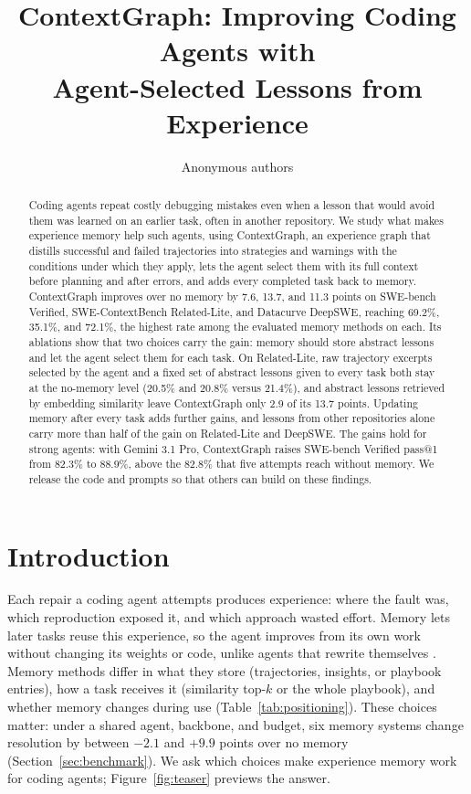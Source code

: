 \documentclass{article}
\title{ContextGraph: Improving Coding Agents with\\Agent-Selected Lessons from Experience}
\author{Anonymous authors}
\begin{document}
\maketitle

\begin{abstract}
Coding agents repeat costly debugging mistakes even when a lesson that would
avoid them was learned on an earlier task, often in another repository. We
study what makes experience memory help such agents, using ContextGraph, an
experience graph that distills successful and failed trajectories into
strategies and warnings with the conditions under which they apply, lets the
agent select them with its full context before planning and after errors,
and adds every completed task back to memory. ContextGraph improves over no
memory by 7.6, 13.7, and 11.3 points on SWE-bench Verified, SWE-ContextBench
Related-Lite, and Datacurve DeepSWE, reaching 69.2\%, 35.1\%, and 72.1\%, the
highest rate among the evaluated memory methods on each. Its ablations show
that two choices carry the gain: memory should store abstract lessons and let
the agent select them for each task. On Related-Lite, raw
trajectory excerpts selected by the agent and a fixed set of abstract lessons
given to every task both stay at the no-memory level (20.5\% and 20.8\%
versus 21.4\%), and abstract lessons retrieved by embedding similarity leave
ContextGraph only 2.9 of its 13.7 points. Updating memory after every task
adds further gains, and lessons from other repositories alone carry more than
half of the gain on Related-Lite and DeepSWE. The gains hold for
strong agents: with Gemini 3.1 Pro, ContextGraph raises SWE-bench Verified
pass@1 from 82.3\% to 88.9\%, above the 82.8\% that five attempts reach
without memory.
We release the code and prompts so that others can build on these findings.
\end{abstract}

\section{Introduction}
\begingroup
\setlength{\parindent}{1em}
\setlength{\parskip}{0pt}

Each repair a coding agent attempts produces experience: where the fault
was, which reproduction exposed it, and which approach wasted effort. Memory
lets later tasks reuse this experience, so the agent improves from its own
work without changing its weights or code, unlike agents that rewrite
themselves \citep{godelagent2025,dgm2026}. Memory methods differ in what
they store (trajectories, insights, or playbook entries), how a task receives
it (similarity top-$k$ or the whole playbook), and whether memory changes
during use \citep{reflexion2023,expel2024,reasoningbank2026,ace2026}
(Table~\ref{tab:positioning}). These choices matter: under a shared agent,
backbone, and budget, six memory systems change resolution by between
$-2.1$ and $+9.9$ points over no memory (Section~\ref{sec:benchmark}). We ask
which choices make experience memory work for coding agents;
Figure~\ref{fig:teaser} previews the answer.
\end{document}
